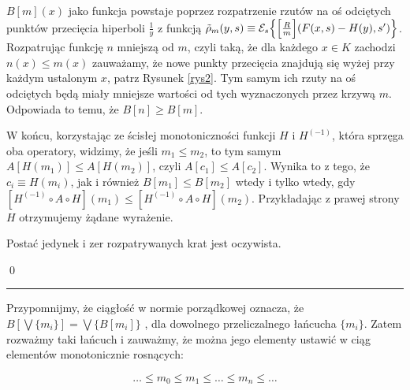 $ B[m](x) $ jako funkcja powstaje poprzez rozpatrzenie rzutów na oś odciętych punktów przecięcia hiperboli $ \frac{1}{y} $ z funkcją $ \tilde{\rho}_m (y,s) \equiv \mathcal{E}_s \Bigl \{\Bigl[ \frac{R}{m} \Bigl] (F(x,s)- H(y), s') \Bigl \} $. Rozpatrując funkcję $n$ mniejszą od $ m $, czyli taką, że dla każdego $x \in K$ zachodzi $ n(x) \leq m(x) $ zauważamy, że nowe punkty przecięcia znajdują się wyżej przy każdym ustalonym $x $, patrz Rysunek \ref{rys2}. Tym samym ich rzuty na oś odciętych będą miały mniejsze wartości od tych wyznaczonych przez krzywą $m$. Odpowiada to temu, że $ B[n] \geq B[m] $. 

W końcu, korzystając ze ścisłej monotoniczności funkcji $ H $ i $ H^{(-1)} $, która sprzęga oba operatory, widzimy, że jeśli $ m_1 \leq m_2 $, to tym samym $ A[H(m_1)] \leq A[H(m_2)] $, czyli $ A[c_1] \leq A [c_2]$. Wynika to z tego, że $ c_i \equiv H(m_i) $, jak i również $ B[m_1] \leq B[m_2] $ wtedy i tylko wtedy, gdy $ [H^{(-1)} \circ A \circ H](m_1) \leq [H^{(-1)} \circ A \circ H](m_2) $. Przykładając z prawej strony $H$ otrzymujemy żądane wyrażenie. 

Postać jedynek i zer rozpatrywanych krat jest oczywista. 


\qed
\newline

\hrule
\begin{dowod}\label{proof_Tarski}
\end{dowod}

	Przypomnijmy, że ciągłość w normie porządkowej oznacza, że $B[\bigvee \{m_i\}] = \bigvee \{ B[m_i]\}$ , dla dowolnego przeliczalnego łańcucha $\{ m_i \}$. Zatem rozważmy taki łańcuch i zauważmy, że można jego elementy ustawić w ciąg elementów monotonicznie rosnących: 
	
\begin{equation*}
\dots \leq m_0 \leq m_1 \leq \dots \leq m_n \leq \dots
\end{equation*}	
	 
